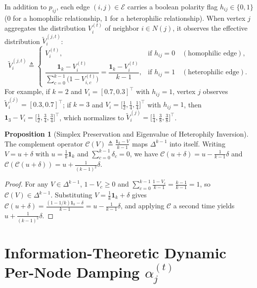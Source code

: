 \documentclass[11pt, a4paper]{article}
\theoremstyle{definition}
\newtheorem{propositionEN}{Proposition}
\theoremstyle{definition}
\begin{document}
In addition to $p_{ij}$, each edge $(i, j) \in \mathcal{E}$ carries a boolean polarity flag $h_{ij} \in \{0, 1\}$ ($0$ for a homophilic relationship, $1$ for a heterophilic relationship). When vertex $j$ aggregates the distribution $V_i^{(t)}$ of neighbor $i \in N(j)$, it observes the effective distribution $\tilde{V}_i^{(j,t)}$:
\begin{equation}\label{eq:heterophily_inversion_en}
\tilde{V}_i^{(j,t)} \triangleq \begin{cases}
V_i^{(t)}, & \text{if } h_{ij} = 0 \quad (\text{homophilic edge}),\\[8pt]
\dfrac{\mathbf{1}_k - V_i^{(t)}}{\displaystyle\sum_{c=0}^{k-1} \big(1 - V_{i,c}^{(t)}\big)} = \dfrac{\mathbf{1}_k - V_i^{(t)}}{k - 1}, & \text{if } h_{ij} = 1 \quad (\text{heterophilic edge}).
\end{cases}
\end{equation}
For example, if $k = 2$ and $V_i = [0.7, 0.3]^\top$ with $h_{ij} = 1$, vertex $j$ observes $\tilde{V}_i^{(j)} = [0.3, 0.7]^\top$; if $k = 3$ and $V_i = \big[\frac{1}{2}, \frac{1}{4}, \frac{1}{4}\big]^\top$ with $h_{ij} = 1$, then $\mathbf{1}_3 - V_i = \big[\frac{1}{2}, \frac{3}{4}, \frac{3}{4}\big]^\top$, which normalizes to $\tilde{V}_i^{(j)} = \big[\frac{1}{4}, \frac{3}{8}, \frac{3}{8}\big]^\top$.

\begin{propositionEN}[Simplex Preservation and Eigenvalue of Heterophily Inversion]\label{prop:simplex_en}
The complement operator $\mathcal{C}(V) \triangleq \frac{\mathbf{1}_k - V}{k - 1}$ maps $\Delta^{k-1}$ into itself. Writing $V = u + \delta$ with $u = \frac{1}{k}\mathbf{1}_k$ and $\sum_{c=0}^{k-1} \delta_c = 0$, we have $\mathcal{C}(u + \delta) = u - \frac{1}{k-1}\delta$ and $\mathcal{C}(\mathcal{C}(u + \delta)) = u + \frac{1}{(k-1)^2}\delta$.
\end{propositionEN}

\begin{proof}
For any $V \in \Delta^{k-1}$, $1 - V_c \ge 0$ and $\sum_{c=0}^{k-1}\frac{1 - V_c}{k - 1} = \frac{k - 1}{k - 1} = 1$, so $\mathcal{C}(V) \in \Delta^{k-1}$. Substituting $V = \frac{1}{k}\mathbf{1}_k + \delta$ gives $\mathcal{C}(u + \delta) = \frac{(1 - 1/k)\mathbf{1}_k - \delta}{k - 1} = u - \frac{1}{k-1}\delta$, and applying $\mathcal{C}$ a second time yields $u + \frac{1}{(k-1)^2}\delta$.
\end{proof}

\section{Information-Theoretic Dynamic Per-Node Damping \texorpdfstring{$\alpha_j^{(t)}$}{alpha\_j\^(t)}}
\end{document}

